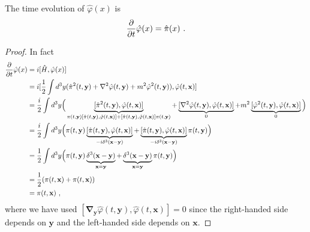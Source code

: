    The time evolution of $\hat \varphi (x)$ is 
    \begin{equation*}
        \frac{\partial}{\partial t} \hat \varphi (x) = \hat \pi (x) ~.
    \end{equation*}
    \begin{proof}
        In fact 
        \begin{equation*}
        \begin{aligned}
            \frac{\partial}{\partial t} \hat \varphi (x) & = i [\hat H, \hat \varphi (x)] \\ & = i [\frac{1}{2} \int d^3 y (\hat \pi^2 (t, \mathbf y) + \nabla^2 \hat \varphi (t, \mathbf y) + m^2 \hat \varphi^2 (t, \mathbf y)) , \hat \varphi (t, \mathbf x)] \\ & = \frac{i}{2} \int d^3 y \Big (\underbrace{[\hat \pi^2 (t, \mathbf y), \hat \varphi (t, \mathbf x)]}_{\pi (t, \mathbf y) [\hat \pi (t, \mathbf y), \hat \varphi (t, \mathbf x)] + [\hat \pi (t, \mathbf y), \hat \varphi (t, \mathbf x)] \pi (t, \mathbf y)} + \underbrace{[\nabla^2 \hat \varphi (t, \mathbf y), \hat \varphi (t, \mathbf x)]}_0 + m^2 \underbrace{[\hat \varphi^2 (t, \mathbf y), \hat \varphi (t, \mathbf x)]}_0 \Big ) \\ & = \frac{i}{2} \int d^3 y \Big (\pi (t, \mathbf y) \underbrace{[\hat \pi (t, \mathbf y), \hat \varphi (t, \mathbf x)]}_{- i \delta^3 (\mathbf x - \mathbf y)} + \underbrace{[\hat \pi (t, \mathbf y), \hat \varphi (t, \mathbf x)] }_{- i \delta^3 (\mathbf x - \mathbf y)} \pi (t, \mathbf y) \Big ) \\ & = \frac{1}{2} \int d^3 y \Big (\pi (t, \mathbf y) \underbrace{\delta^3 (\mathbf x - \mathbf y)}_{\mathbf x = \mathbf y} + \underbrace{\delta^3 (\mathbf x - \mathbf y)}_{\mathbf x = \mathbf y} \pi (t, \mathbf y) \Big ) \\ & = \frac{1}{2} (\pi (t, \mathbf x) + \pi (t, \mathbf x)) \\ & = \pi (t, \mathbf x) ~,
        \end{aligned}
        \end{equation*}
        where we have used $[\boldsymbol \nabla_{\mathbf y} \hat \varphi (t, \mathbf y), \hat \varphi (t, \mathbf x)] = 0$ since the right-handed side depends on $\mathbf y$ and the left-handed side depends on $\mathbf x$.
    \end{proof}

